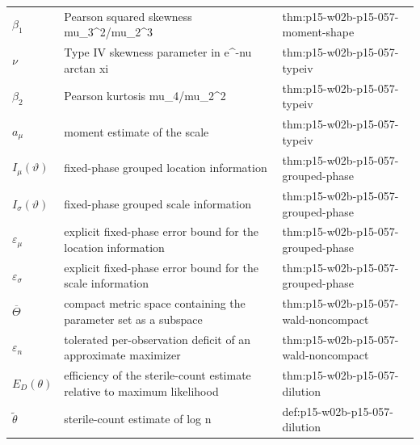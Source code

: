 \begin{longtable}{@{}p{}p{}p{}@{}}
\(\beta_1\) & Pearson squared skewness mu\_3\^{}2/mu\_2\^{}3 & thm:\allowbreak{}p15-\allowbreak{}w02b-\allowbreak{}p15-\allowbreak{}057-\allowbreak{}moment-\allowbreak{}shape \\
\(\nu\) & Type IV skewness parameter in e\^{}{-nu arctan xi} & thm:\allowbreak{}p15-\allowbreak{}w02b-\allowbreak{}p15-\allowbreak{}057-\allowbreak{}typeiv \\
\(\beta_2\) & Pearson kurtosis mu\_4/mu\_2\^{}2 & thm:\allowbreak{}p15-\allowbreak{}w02b-\allowbreak{}p15-\allowbreak{}057-\allowbreak{}typeiv \\
\(a_\mu\) & moment estimate of the scale & thm:\allowbreak{}p15-\allowbreak{}w02b-\allowbreak{}p15-\allowbreak{}057-\allowbreak{}typeiv \\
\(I_\mu(\vartheta)\) & fixed-phase grouped location information & thm:\allowbreak{}p15-\allowbreak{}w02b-\allowbreak{}p15-\allowbreak{}057-\allowbreak{}grouped-\allowbreak{}phase \\
\(I_\sigma(\vartheta)\) & fixed-phase grouped scale information & thm:\allowbreak{}p15-\allowbreak{}w02b-\allowbreak{}p15-\allowbreak{}057-\allowbreak{}grouped-\allowbreak{}phase \\
\(\varepsilon_\mu\) & explicit fixed-phase error bound for the location information & thm:\allowbreak{}p15-\allowbreak{}w02b-\allowbreak{}p15-\allowbreak{}057-\allowbreak{}grouped-\allowbreak{}phase \\
\(\varepsilon_\sigma\) & explicit fixed-phase error bound for the scale information & thm:\allowbreak{}p15-\allowbreak{}w02b-\allowbreak{}p15-\allowbreak{}057-\allowbreak{}grouped-\allowbreak{}phase \\
\(\overline\Theta\) & compact metric space containing the parameter set as a subspace & thm:\allowbreak{}p15-\allowbreak{}w02b-\allowbreak{}p15-\allowbreak{}057-\allowbreak{}wald-\allowbreak{}noncompact \\
\(\varepsilon_n\) & tolerated per-observation deficit of an approximate maximizer & thm:\allowbreak{}p15-\allowbreak{}w02b-\allowbreak{}p15-\allowbreak{}057-\allowbreak{}wald-\allowbreak{}noncompact \\
\(E_D(\theta)\) & efficiency of the sterile-count estimate relative to maximum likelihood & thm:\allowbreak{}p15-\allowbreak{}w02b-\allowbreak{}p15-\allowbreak{}057-\allowbreak{}dilution \\
\(\widetilde\theta\) & sterile-count estimate of log n & def:\allowbreak{}p15-\allowbreak{}w02b-\allowbreak{}p15-\allowbreak{}057-\allowbreak{}dilution \\

\end{longtable}
